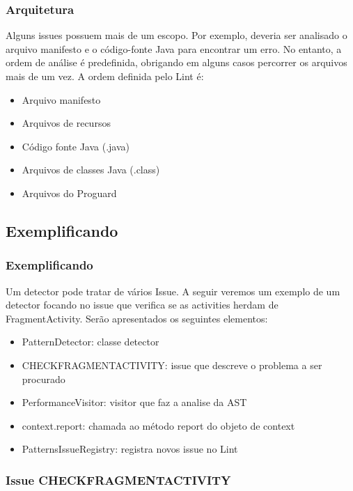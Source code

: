 \documentclass{beamer}
\begin{document}
   \frame
   {
        \frametitle{Arquitetura}
        Alguns issues possuem mais de um escopo. Por exemplo, deveria ser analisado
        o arquivo manifesto e o código-fonte Java para encontrar um erro. No entanto,
        a ordem de análise é predefinida, obrigando em alguns casos percorrer os
        arquivos mais de um vez. A ordem definida pelo Lint é:
        \begin{itemize}       
            \item Arquivo manifesto
            \item Arquivos de recursos
            \item Código fonte Java (.java)
            \item Arquivos de classes Java (.class)
            \item Arquivos do Proguard
        \end{itemize}
   }
   \subsection{Exemplificando}
   \frame
   {
        \frametitle{Exemplificando}
        Um detector pode tratar de vários Issue. A seguir veremos um exemplo de
        um detector focando no issue que verifica se as activities herdam de FragmentActivity.
        Serão apresentados os seguintes elementos:
        \begin{itemize}
            \item PatternDetector: classe detector
            \item CHECKFRAGMENTACTIVITY: issue que descreve o problema a ser procurado
            \item PerformanceVisitor: visitor que faz a analise da AST
            \item context.report: chamada ao método report do objeto de context
            \item PatternsIssueRegistry: registra novos issue no Lint
        \end{itemize}
        
   } 

   \frame
   {
    \frametitle{Issue CHECKFRAGMENTACTIVITY}
    
   }
   
   
   
\end{document}
